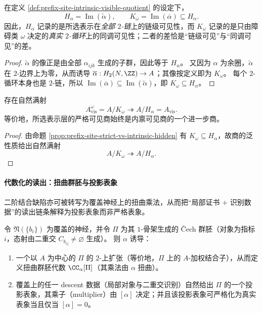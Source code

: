 \begin{proposition}[严格隐藏子群与内禀隐藏子群]\label{prop:prefix-site-strict-vs-intrinsic-hidden}
在定义 \ref{def:prefix-site-intrinsic-visible-quotient} 的设定下，
\[
H_\alpha=\operatorname{Im}(\widetilde\alpha),
\qquad
K_\omega=\operatorname{Im}(\overline\alpha)\subseteq H_\alpha.
\]
因此，\(H_\alpha\) 记录的是所选表示在\emph{全部 \(2\)-链}上的链级可见性，而 \(K_\omega\) 记录的是只由障碍类 \(\omega\) 决定的\emph{真实 \(2\)-循环}上的同调可见性；二者的差恰是“链级可见”与“同调可见”的差。
\end{proposition}

\begin{proof}
\(\widetilde\alpha\) 的像正是由全部 \(\alpha_{ijk}\) 生成的子群，因此等于 \(H_\alpha\)。
又因为 \(\alpha\) 为余圈，\(\widetilde\alpha\) 在 \(2\)-边界上为零，从而诱导 \(\overline\alpha:H_2(N,\ZZ)\to A\)；其像按定义即为 \(K_\omega\)。
每个 \(2\)-循环本身也是 \(2\)-链，所以 \(\operatorname{Im}(\overline\alpha)\subseteq \operatorname{Im}(\widetilde\alpha)\)，即 \(K_\omega\subseteq H_\alpha\)。
\end{proof}

\begin{corollary}[内禀可见商到严格可见商的自然满射]\label{cor:prefix-site-intrinsic-to-strict-visible}
存在自然满射
\[
A_{\mathrm{vis}}^\omega=A/K_\omega\twoheadrightarrow A/H_\alpha=A_{\mathrm{vis}}.
\]
等价地，所选表示层的严格可见商始终是内禀可见商的一个进一步商。
\end{corollary}

\begin{proof}
由命题 \ref{prop:prefix-site-strict-vs-intrinsic-hidden} 有 \(K_\omega\subseteq H_\alpha\)，故商的泛性质给出自然满射
\[
A/K_\omega\twoheadrightarrow A/H_\alpha.
\]
\end{proof}

\paragraph{代数化的读出：扭曲群胚与投影表象}
二阶结合缺陷亦可被转写为覆盖神经上的扭曲乘法，从而把“局部证书 + 识别数据”的读出链条解释为投影表象而非严格表象。

\begin{proposition}\label{prop:prefix-site-projective-rep-twist}
令 \(\mathfrak N(\{b_i\})\) 为覆盖的神经，并令 \(\Pi\) 为其 \(1\)-骨架生成的 Čech 群胚（对象为指标 \(i\)，态射由二重交 \(C_{b_{ij}}\neq\varnothing\) 生成）。
则 \(\alpha\) 诱导：
\begin{enumerate}
  \item 一个以 \(A\) 为中心的 \(\Pi\) 的 \(2\)-上扩张（等价地，\(\Pi\) 上的 \(A\)-加权结合子），从而定义扭曲群胚代数 \(\CC_\alpha[\Pi]\)（其乘法由 \(\alpha\) 扭曲）。
  \item 覆盖上的任一 descent 数据（局部对象与二重交识别）自然给出 \(\Pi\) 的一个投影表象，其乘子（multiplier）由 \([\alpha]\) 决定；并且该投影表象可严格化为真实表象当且仅当 \([\alpha]=0\)。
\end{enumerate}
\end{proposition}

